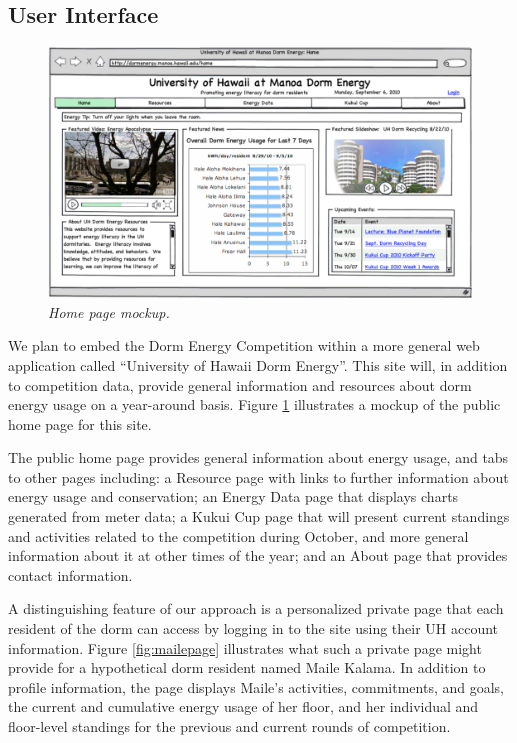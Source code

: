 \documentclass[11pt]{article}
\begin{document}
\subsection{User Interface}
\label{sec:userinterface}

\begin{figure}[!ht]
  \center
  \includegraphics[width=1.0\textwidth]{home.png.eps}
  \caption{\em \small Home page mockup.}
 \label{fig:homepage}
\end{figure} 

We plan to embed the Dorm Energy Competition within a more general web
application called ``University of Hawaii Dorm Energy''.  This site will,
in addition to competition data, provide general information and resources
about dorm energy usage on a year-around basis.   Figure \ref{fig:homepage}
illustrates a mockup of the public home page for this site. 


The public home page provides general information about energy usage, and
tabs to other pages including: a Resource page with links to further
information about energy usage and conservation; an Energy Data page that
displays charts generated from meter data; a Kukui Cup page that will
present current standings and activities related to the competition during
October, and more general information about it at other times of the year;
and an About page that provides contact information.

A distinguishing feature of our approach is a personalized private page that each
resident of the dorm can access by logging in to the site using their UH
account information.  Figure \ref{fig:mailepage} illustrates what such a
private page might provide for a hypothetical dorm resident named Maile Kalama.  In
addition to profile information, the page displays Maile's activities,
commitments, and goals, the current and cumulative energy usage of her
floor, and her individual and floor-level standings for the previous and
current rounds of competition.
\end{document}
